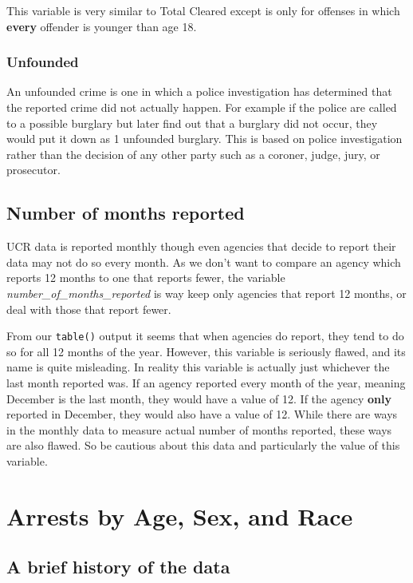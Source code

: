 \documentclass[
  12pt,
  openany]{book}
\begin{document}
This variable is very similar to Total Cleared except is only for offenses in which \textbf{every} offender is younger than age 18.

\hypertarget{unfounded}{%
\subsection{Unfounded}\label{unfounded}}

An unfounded crime is one in which a police investigation has determined that the reported crime did not actually happen. For example if the police are called to a possible burglary but later find out that a burglary did not occur, they would put it down as 1 unfounded burglary. This is based on police investigation rather than the decision of any other party such as a coroner, judge, jury, or prosecutor.

\hypertarget{number-of-months-reported}{%
\section{Number of months reported}\label{number-of-months-reported}}

UCR data is reported monthly though even agencies that decide to report their data may not do so every month. As we don't want to compare an agency which reports 12 months to one that reports fewer, the variable \emph{number\_of\_months\_reported} is way keep only agencies that report 12 months, or deal with those that report fewer.

From our \texttt{table()} output it seems that when agencies do report, they tend to do so for all 12 months of the year. However, this variable is seriously flawed, and its name is quite misleading. In reality this variable is actually just whichever the last month reported was. If an agency reported every month of the year, meaning December is the last month, they would have a value of 12. If the agency \textbf{only} reported in December, they would also have a value of 12. While there are ways in the monthly data to measure actual number of months reported, these ways are also flawed. So be cautious about this data and particularly the value of this variable.

\hypertarget{arrests}{%
\chapter{Arrests by Age, Sex, and Race}\label{arrests}}

\hypertarget{a-brief-history-of-the-data}{%
\section{A brief history of the data}\label{a-brief-history-of-the-data}}
\end{document}
